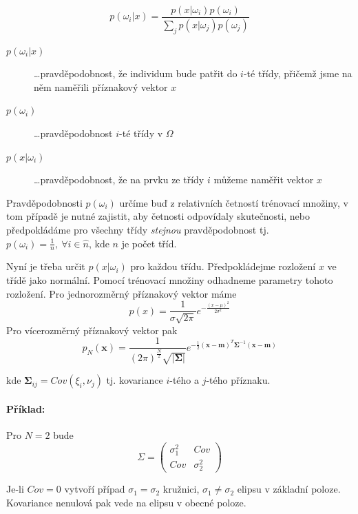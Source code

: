 \begin{equation}
p(\omega_i|x)=\frac{p(x|\omega_i)p(\omega_i)}{\sum\limits_j p(x|\omega_j)p(\omega_j)}
\end{equation}

\begin{description}
	\item[$p(\omega_i|x)$] \dots pravděpodobnost, že individum bude patřit do $i$-té třídy, přičemž 
	jsme na něm naměřili příznakový vektor $x$
	\item[$p(\omega_i)$] \dots pravděpodobnost $i$-té třídy v $\Omega$
	\item[$p(x|\omega_i)$] \dots pravděpodobnost, že na prvku ze třídy $i$ můžeme naměřit vektor $x$
\end{description}

Pravděpodobnosti $p(\omega_i)$ určíme buď z relativních četností trénovací množiny, v tom případě je nutné
zajistit, aby četnosti odpovídaly skutečnosti, nebo předpokládáme pro všechny třídy \emph{stejnou} pravděpodobnost
tj. $p(\omega_i)=\frac{1}{n},\ \forall i\in \hat{n}$, kde $n$ je počet tříd.

Nyní je třeba určit $p(x|\omega_i)$ pro každou třídu. Předpokládejme rozložení $x$ ve třídě jako normální. Pomocí
trénovací množiny odhadneme parametry tohoto rozložení. Pro jednorozměrný příznakový vektor máme
\begin{equation}
p(x) = \frac{1}{\sigma \sqrt{2\pi}}e^{-\frac{(x-\mu)^2}{2\sigma^2}}
\end{equation}
Pro vícerozměrný příznakový vektor pak
\begin{equation}
p_N(\bm x) = \frac{1}{(2\pi)^\frac{N}{2}\sqrt{|\bm \Sigma|}}e^{-\frac{1}{2}(\bm x-\bm m)^T\bm \Sigma^{-1}(\bm x-\bm m)}
\end{equation}

kde $\bm \Sigma_{ij}=Cov(\xi_i,\nu_j)$ tj. kovariance $i$-tého a $j$-tého příznaku.

\paragraph{Příklad:}
Pro $N=2$ bude
$$
\Sigma=\left(\begin{array}{cc}\sigma_1^2 & Cov\\ Cov & \sigma_2^2\end{array}\right)
$$

Je-li $Cov=0$ vytvoří případ $\sigma_1=\sigma_2$ kružnici, $\sigma_1\neq\sigma_2$ elipsu v základní poloze.
Kovariance nenulová pak vede na elipsu v obecné poloze.

